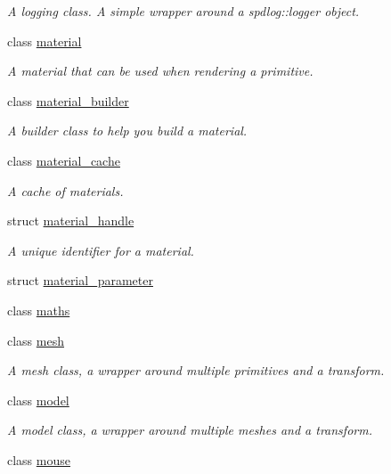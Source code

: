 \begin{DoxyCompactItemize}
\begin{DoxyCompactList}\small\item\em A logging class. A simple wrapper around a spdlog\+::logger object. \end{DoxyCompactList}\item 
class \mbox{\hyperlink{classmoka_1_1material}{material}}
\begin{DoxyCompactList}\small\item\em A material that can be used when rendering a primitive. \end{DoxyCompactList}\item 
class \mbox{\hyperlink{classmoka_1_1material__builder}{material\+\_\+builder}}
\begin{DoxyCompactList}\small\item\em A builder class to help you build a material. \end{DoxyCompactList}\item 
class \mbox{\hyperlink{classmoka_1_1material__cache}{material\+\_\+cache}}
\begin{DoxyCompactList}\small\item\em A cache of materials. \end{DoxyCompactList}\item 
struct \mbox{\hyperlink{structmoka_1_1material__handle}{material\+\_\+handle}}
\begin{DoxyCompactList}\small\item\em A unique identifier for a material. \end{DoxyCompactList}\item 
struct \mbox{\hyperlink{structmoka_1_1material__parameter}{material\+\_\+parameter}}
\item 
class \mbox{\hyperlink{classmoka_1_1maths}{maths}}
\item 
class \mbox{\hyperlink{classmoka_1_1mesh}{mesh}}
\begin{DoxyCompactList}\small\item\em A mesh class, a wrapper around multiple primitives and a transform. \end{DoxyCompactList}\item 
class \mbox{\hyperlink{classmoka_1_1model}{model}}
\begin{DoxyCompactList}\small\item\em A model class, a wrapper around multiple meshes and a transform. \end{DoxyCompactList}\item 
class \mbox{\hyperlink{classmoka_1_1mouse}{mouse}}

\end{DoxyCompactItemize}
